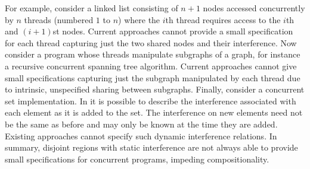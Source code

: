 For example, consider a linked list consisting of $n+1$ nodes accessed
concurrently by $n$ threads (numbered $1$ to $n$) where the $i$th
thread requires access to the $i$th and $(i+1)$st nodes. Current
approaches cannot provide a small specification for each thread capturing just the two shared nodes and their interference. Now consider a program whose threads manipulate subgraphs of a graph, for instance  a recursive
concurrent spanning tree algorithm. Current approaches cannot give small specifications capturing just the subgraph manipulated by each thread due to intrinsic, unspecified sharing  between subgraphs.
Finally, consider a concurrent set implementation. In \colosl it is possible to describe the interference associated with each element as it is added to the set. The interference on new elements need not be the same as before and may only be known at the time they are added. Existing approaches cannot specify such dynamic interference relations.
In summary, disjoint regions with static interference are not always able to provide small
specifications for concurrent programs, impeding 
compositionality.





